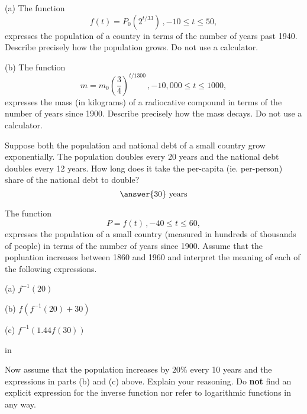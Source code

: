 \documentclass{ximera}
\newcommand{\pskip}{\vskip 0.1 in}
\begin{document}
\begin{question} \label{Q23:ExponentialG}
(a) The function 
\[
   f(t) = P_0 (2^{t/33}) \, , -10\leq t \leq 50 ,
\]
expresses the population of a country in terms of the number of years past 1940. Describe precisely how the population grows. Do not use a calculator.

(b) The function 
\[
   m = m_0 \left( \frac{3}{4} \right)^{t/1300} \, , -10,000\leq t \leq 1000 ,
\]
expresses the mass (in kilograms) of a radiocative compound in terms of the number of years since 1900. Describe precisely how the mass decays. Do not use a calculator.

\end{question}



\begin{question}   \label{Q9:ExponentialG}
Suppose both the population and national debt of a small country grow exponentially. The population doubles every 20 years and the national debt doubles every 12 years. How long does it take the per-capita (ie. per-person) share of the national debt to double?
\[
    \answer{30} \text{ years}
\]
\end{question}



\begin{question} \label{Q24:ExponentialG}
The function 
\[
   P = f(t) \, , -40\leq t \leq 60 ,
\]
expresses the population of a small country (measured in hundreds of thousands of people) in terms of the number of years since 1900. Assume that the popluation increases between 1860 and 1960 and interpret the meaning of each of the following expressions.

(a) $f^{-1}(20)$

(b) $f(f^{-1}(20) + 30)$

(c) $f^{-1}(1.44 f(30))$

\pskip

Now assume that the population increases by $20\%$ every 10 years and the expressions in parts (b) and (c) above. Explain your reasoning. Do {\bf not} find an explicit expression for the inverse function nor refer to logarithmic functions in any way.


\end{question}
\end{document}
